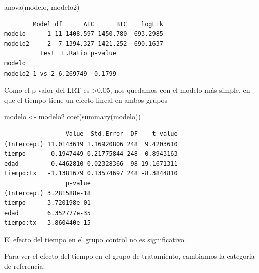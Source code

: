 \documentclass[
]{book}
\newenvironment{Shaded}{\begin{snugshade}}{\end{snugshade}}
\newcommand{\DecValTok}[1]{\textcolor[rgb]{0.00,0.00,0.81}{#1}}
\newcommand{\FunctionTok}[1]{\textcolor[rgb]{0.00,0.00,0.00}{#1}}
\newcommand{\NormalTok}[1]{#1}
\newcommand{\OtherTok}[1]{\textcolor[rgb]{0.56,0.35,0.01}{#1}}
\newcommand{\SpecialCharTok}[1]{\textcolor[rgb]{0.00,0.00,0.00}{#1}}
\begin{document}
\begin{Shaded}
\begin{Highlighting}[]
\FunctionTok{anova}\NormalTok{(modelo, modelo2)}
\end{Highlighting}
\end{Shaded}

\begin{verbatim}
        Model df      AIC      BIC    logLik
modelo      1 11 1408.597 1450.780 -693.2985
modelo2     2  7 1394.327 1421.252 -690.1637
          Test  L.Ratio p-value
modelo                         
modelo2 1 vs 2 6.269749  0.1799
\end{verbatim}

Como el p-valor del LRT es \textgreater0.05, nos quedamos con el modelo más simple, en que el tiempo tiene un efecto lineal en ambos grupos

\begin{Shaded}
\begin{Highlighting}[]
\NormalTok{modelo }\OtherTok{\textless{}{-}}\NormalTok{ modelo2}
\FunctionTok{coef}\NormalTok{(}\FunctionTok{summary}\NormalTok{(modelo))}
\end{Highlighting}
\end{Shaded}

\begin{verbatim}
                 Value  Std.Error  DF    t-value
(Intercept) 11.0143619 1.16920806 248  9.4203610
tiempo       0.1947449 0.21775844 248  0.8943163
edad         0.4462810 0.02328366  98 19.1671311
tiempo:tx   -1.1381679 0.13574697 248 -8.3844810
                 p-value
(Intercept) 3.281588e-18
tiempo      3.720198e-01
edad        6.352777e-35
tiempo:tx   3.860440e-15
\end{verbatim}

El efecto del tiempo en el grupo control no es significativo.

Para ver el efecto del tiempo en el grupo de tratamiento, cambiamos la categoria de referencia:

\begin{Shaded}
\end{Shaded}
\end{document}
